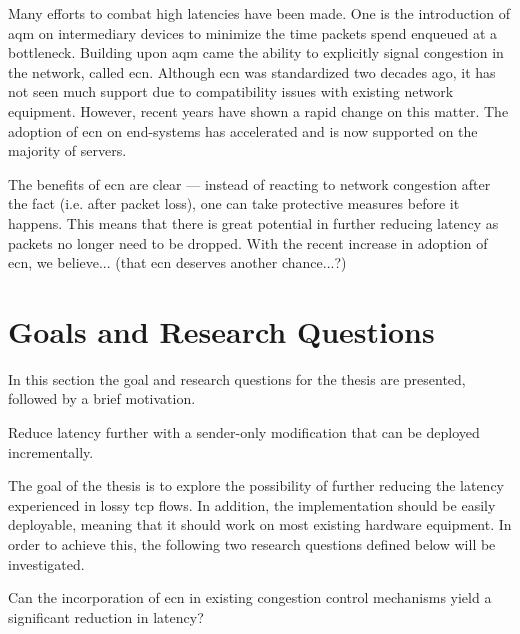 Many efforts to combat high latencies have been made. One is the introduction of \gls{aqm} on intermediary devices to minimize the time packets spend enqueued at a bottleneck. Building upon \gls{aqm} came the ability to explicitly signal congestion in the network, called \gls{ecn}. Although \gls{ecn} was standardized two decades ago, it has not seen much support due to compatibility issues with existing network equipment. However, recent years have shown a rapid change on this matter. The adoption of \gls{ecn} on end-systems has accelerated and is now supported on the majority of servers. \cite{enabling_internet-wide_ecn}

The benefits of \gls{ecn} are clear --- instead of reacting to network congestion after the fact (i.e. after packet loss), one can take protective measures before it happens. This means that there is great potential in further reducing latency as packets no longer need to be dropped. With the recent increase in adoption of \gls{ecn}, we believe... (that ecn deserves another chance...?)  






\section{Goals and Research Questions} \label{goals_and_research_questions}

In this section the goal and research questions for the thesis are presented, followed by a brief motivation.

\begin{statement}
    Reduce latency further with a sender-only modification that can be deployed incrementally.
\end{statement}

The goal of the thesis is to explore the possibility of further reducing the latency experienced in lossy \gls{tcp} flows. In addition, the implementation should be easily deployable, meaning that it should work on most existing hardware equipment. In order to achieve this, the following two research questions defined below will be investigated.

\begin{statement}
    Can the incorporation of \gls{ecn} in existing congestion control mechanisms yield a significant reduction in latency?
\end{statement}

